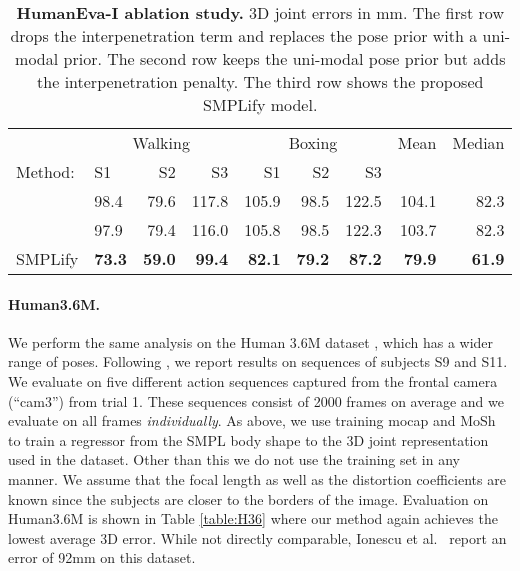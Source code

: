 \documentclass[runningheads]{llncs}
\begin{document}
\begin{table}[b]
\centering
\begin{tabular}{llrrrrrrr}
\hline
 & \multicolumn{3}{c}{Walking} & \multicolumn{3}{c}{Boxing} &  Mean & Median\\
Method: & S1 & S2 & S3 & S1 & S2 & S3 & \\
\hline

& 98.4 & 79.6 & 117.8 & 105.9 & 98.5 & 122.5 & 104.1 & 82.3 \\
 & 97.9 & 79.4 & 116.0 & 105.8 & 98.5 &
                                                                                122.3
                  & 103.7 & 82.3 \\

SMPLify  & \textbf{73.3} & \textbf{59.0} & \textbf{99.4} & \textbf{82.1} &
                                                                         \textbf{79.2}
             & \textbf{87.2} & \textbf{79.9}  & \textbf{61.9}\\
\hline
\end{tabular}
\caption{{\bf HumanEva-I ablation study.} 3D joint errors in mm. The first row drops the
  interpenetration term and replaces the pose prior with a 
uni-modal prior. The second row keeps the uni-modal pose prior but adds the
interpenetration penalty. The third row shows the proposed SMPLify
model.}
\label{table:ablation}
\end{table}

\paragraph{Human3.6M.}
We perform the same analysis on the Human 3.6M dataset
\cite{Human36m:2014},  which has a wider range of poses.
Following \cite{Li:ACCV14,Tekin:2015,Zhou:CVPR:2016}, we report
results on sequences of subjects S9 and S11. 
We evaluate on five different action sequences captured
from the frontal camera (``cam3'') from trial 1. 
These sequences consist of 2000 frames on average and we evaluate on
all frames {\em individually}.
As above, we use training mocap and MoSh to train a regressor from the
SMPL body shape to the 3D joint representation used in the dataset. 
Other than this we do not use the training set in any manner.
We assume that the focal length as well as the distortion coefficients
are known since the subjects are closer to the borders of the image. 
Evaluation on Human3.6M is shown in Table \ref{table:H36} where our
method again achieves the
lowest average 3D error.
While not directly comparable, Ionescu et al.~\cite{Ionescu:CVPR:2014} report an error
of 92mm on this dataset.
\end{document}
